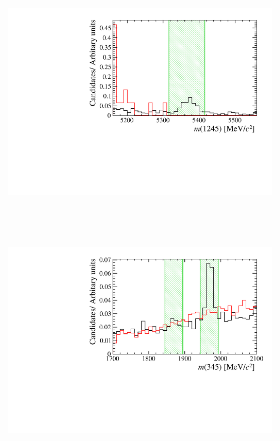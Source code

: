 \begin{figure}[!h]
   \centering
   \begin{subfigure}[t]{1.0\textwidth}
      \centering
      \begin{subfigure}[t]{0.32\textwidth}
         \includegraphics[width=1.0\textwidth]{figs/Selection/Veto_Comparison_B2DsKK_Ds2KKPi_m1245.pdf}
      \end{subfigure}\\
      \begin{subfigure}[t]{0.32\textwidth}
         \includegraphics[width=1.0\textwidth]{figs/Selection/Veto_Comparison_B2DsKK_Ds2KKPi_m345.pdf}
      \end{subfigure}
      \begin{subfigure}[t]{0.32\textwidth}

\end{subfigure}
\end{subfigure}
\end{figure}

